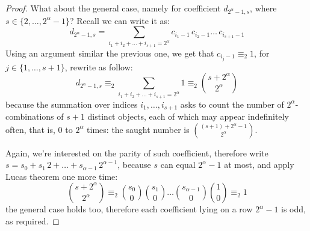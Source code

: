 \documentclass[11pt,a4paper]{article} %
\begin{document}
\begin{proof}
        What about the general case, namely for coefficient $d_{2^{\alpha}-1,s}$, where
        $s\in\lbrace{2,\ldots,2^{\alpha}-1}\rbrace$?  Recall we can write it as:
        \begin{displaymath}
            d_{2^{\alpha}-1,s} = \sum_{i_{1}+i_{2}+\ldots+i_{s+1}=2^{\alpha}}
                {c_{i_{1}-1}\,c_{i_{2}-1}\ldots\,c_{i_{s+1}-1}}
        \end{displaymath}
        Using an argument similar the previous one, we get that $c_{i_{j}-1}\equiv_{2}1$,
        for $j\in\lbrace1,\ldots,s+1\rbrace$, rewrite as follow:
        \begin{displaymath}
            d_{2^{\alpha}-1,s} \equiv_{2} \sum_{i_{1}+i_{2}+\ldots+i_{s+1}=2^{\alpha}}{1}
                \equiv_{2} {{s+2^{\alpha}}\choose{2^{\alpha}}}
        \end{displaymath}
        because the summation over indices $i_{1},\ldots,i_{s+1}$ asks to 
        count the number of $2^{\alpha}$-combinations of $s+1$ distinct objects,
        each of which may appear indefinitely often, that is, $0$ to $2^{\alpha}$
        times: the saught number is ${{(s+1)+2^{\alpha}-1}\choose{2^{\alpha}}}$.

        Again, we're interested on the parity of such coefficient, therefore
        write $s=s_{0}+s_{1}\,2+\ldots+s_{\alpha-1}\,2^{\alpha-1}$, because $s$ can equal 
        $2^{\alpha}-1$ at most, and apply Lucas theorem one more time:
        \begin{displaymath}
            {{s+2^{\alpha}}\choose{2^{\alpha}}}\equiv_{2} 
                {{s_{0}}\choose{0}}{{s_{1}}\choose{0}} \ldots
                    {{s_{\alpha-1}}\choose{0}}{{1}\choose{0}}\equiv_{2}1 
        \end{displaymath}
        the general case holds too, therefore each coefficient lying on
        a row $2^{\alpha}-1$ is odd, as required.
    \end{proof}
\end{document}
